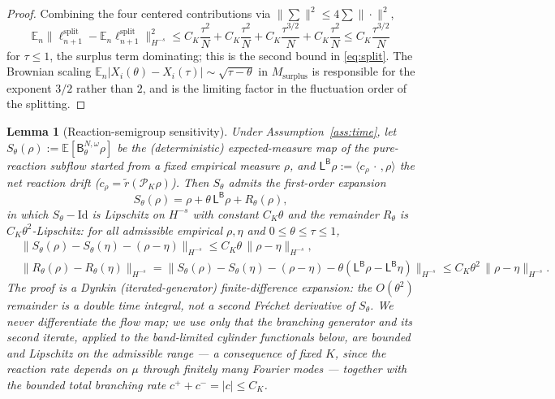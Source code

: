 \documentclass[a4paper,fleqn]{cas-sc}
\newtheorem{lemma}[theorem]{Lemma}
\theoremstyle{definition}
\theoremstyle{remark}
\begin{document}
\begin{proof}
Combining the four centered contributions via $\|\sum\|^2\le4\sum\|\cdot\|^2$,
\[
\mathbb E_n\|\ell^{\mathrm{split}}_{n+1}-\mathbb E_n\ell^{\mathrm{split}}_{n+1}\|_{H^{-s}}^2
\le C_K\frac{\tau^2}{N}+C_K\frac{\tau^2}{N}+C_K\frac{\tau^{3/2}}{N}+C_K\frac{\tau^2}{N}
\le C_K\frac{\tau^{3/2}}{N}
\]
for $\tau\le1$, the surplus term dominating; this is the second bound in
\eqref{eq:split}. The Brownian scaling
$\mathbb E_n|X_i(\theta)-X_i(\tau)|\sim\sqrt{\tau-\theta}$ in
$M_{\mathrm{surplus}}$ is responsible for the exponent $3/2$ rather than $2$, and
is the limiting factor in the fluctuation order of the splitting.
\end{proof}

\begin{lemma}[Reaction-semigroup sensitivity]\label{lem:sens}
Under Assumption~\ref{ass:time}, let
$S_\theta(\rho):=\mathbb E[\mathsf B^{N,\omega}_\theta\rho]$ be the (deterministic)
expected-measure map of the pure-reaction subflow started from a fixed empirical
measure $\rho$, and $\mathsf L^{\mathsf B}\rho:=\langle c_\rho\,\cdot\,,\rho\rangle$ the
net reaction drift ($c_\rho=\tilde r(\mathcal P_K\rho)$). Then $S_\theta$ admits the
first-order expansion
\[
S_\theta(\rho)=\rho+\theta\,\mathsf L^{\mathsf B}\rho+R_\theta(\rho),
\]
in which $S_\theta-\mathrm{Id}$ is Lipschitz on $H^{-s}$ with constant $C_K\theta$ and
the remainder $R_\theta$ is $C_K\theta^2$-Lipschitz: for all admissible empirical
$\rho,\eta$ and $0\le\theta\le\tau\le1$,
\begin{equation}\label{eq:sens}
\begin{aligned}
&\|S_\theta(\rho)-S_\theta(\eta)-(\rho-\eta)\|_{H^{-s}}\le C_K\theta\,\|\rho-\eta\|_{H^{-s}},\\
&\|R_\theta(\rho)-R_\theta(\eta)\|_{H^{-s}}
=\bigl\|S_\theta(\rho)-S_\theta(\eta)-(\rho-\eta)-\theta(\mathsf L^{\mathsf B}\rho-\mathsf L^{\mathsf B}\eta)\bigr\|_{H^{-s}}
\le C_K\theta^2\,\|\rho-\eta\|_{H^{-s}}.
\end{aligned}
\end{equation}
The proof is a Dynkin (iterated-generator) finite-difference expansion: the
$O(\theta^2)$ remainder is a \emph{double time integral}, not a second Fréchet
derivative of $S_\theta$. We never differentiate the flow map; we use only that the
branching generator and its second iterate, applied to the band-limited cylinder
functionals below, are bounded and Lipschitz on the admissible range --- a consequence
of fixed $K$, since the reaction rate depends on $\mu$ through finitely many Fourier
modes --- together with the bounded total branching rate $c^++c^-=|c|\le C_K$.
\end{lemma}
\end{document}
